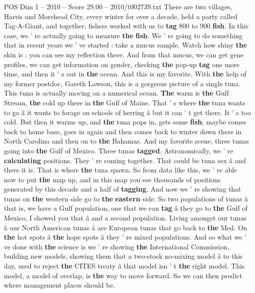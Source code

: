 \begin{textsample}{POS Dim 1 – 2010 – Score 29.00 – 2010/t002739.txt}
There are two villages, Harris and Morehead City, every winter for over a decade, held a party called Tag-A-Giant, and together, fishers worked with us to \textbf{tag} 800 to 900 \textbf{fish}.
In this case, we ' re actually going to measure \textbf{the} \textbf{fish}.
We ' re going to do something that in recent years we ' ve started : take a mucus sample.
Watch how shiny \textbf{the} skin is ; you can see my reflection there.
And from that mucus, we can get gene profiles, we can get information on gender, checking \textbf{the} pop-up \textbf{tag} one more time, and then it ' s out in \textbf{the} ocean.
And this is my favorite.
With \textbf{the} help of my former postdoc, Gareth Lawson, this is a gorgeous picture of a single tuna.
This tuna is actually moving on a numerical ocean. \textbf{The} warm is \textbf{the} Gulf Stream, \textbf{the} cold up there in \textbf{the} Gulf of Maine.
That ' s where \textbf{the} tuna wants to go â it wants to forage on schools of herring â but it can ' t get there.
It ' s too cold.
But then it warms up, and \textbf{the} tuna pops in, gets some \textbf{fish}, maybe comes back to home base, goes in again and then comes back to winter down there in North Carolina and then on to \textbf{the} Bahamas.
And my favorite scene, three tunas going into \textbf{the} Gulf of Mexico.
Three tunas \textbf{tagged}.
Astronomically, we ' re \textbf{calculating} positions.
They ' re coming together.
That could be tuna sex â and there it is.
That is where \textbf{the} tuna spawn.
So from data like this, we ' re able now to put \textbf{the} map up, and in this map you see thousands of positions generated by this decade and a half of \textbf{tagging}.
And now we ' re showing that tunas on \textbf{the} western side go to \textbf{the} \textbf{eastern} side.
So two populations of tunas â that is, we have a Gulf population, one that we can \textbf{tag} â they go to \textbf{the} Gulf of Mexico, I showed you that â and a second population.
Living amongst our tunas â our North American tunas â are European tunas that go back to \textbf{the} Med.
On \textbf{the} hot spots â \textbf{the} hope spots â they ' re mixed populations.
And so what we ' ve done with \textbf{the} science is we ' re showing \textbf{the} International Commission, building new models, showing them that a two-stock no-mixing model â to this day, used to reject \textbf{the} CITES treaty â that model isn ' t \textbf{the} right model.
This model, a model of overlap, is \textbf{the} way to move forward.
So we can then predict where management places should be.

\end{textsample}
